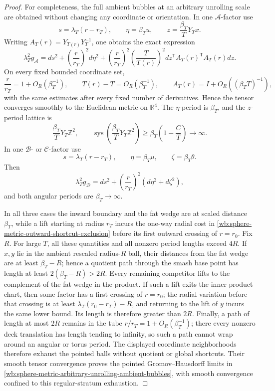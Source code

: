 \begin{proof}
For completeness, the full ambient bubbles at an arbitrary unrolling scale
are obtained without changing any coordinate or orientation.  In one
\(\mathcal A\)-factor use
\[
 s=\lambda_T(r-r_T),\qquad
 \eta=\beta_Tu,\qquad
 z=\frac{\beta_T}{T}Y_Tx.
\]
Writing \(A_T(r)=Y_{T(r)}Y_T^{-1}\), one obtains the exact expression
\[
 \lambda_T^2g_{\mathcal A}
 =ds^2+\left(\frac r{r_T}\right)^2d\eta^2
  +\left(\frac r{r_T}\right)^2
   \left(\frac{T}{T(r)}\right)^2
   dz^{\mathsf T}A_T(r)^{\mathsf T}A_T(r)dz.
\]
On every fixed bounded coordinate set,
\[
 \frac r{r_T}=1+O_R(\beta_T^{-1}),\qquad
 T(r)-T=O_R(\beta_T^{-1}),\qquad
 A_T(r)=I+O_R((\beta_TT)^{-1}),
\]
with the same estimates after every fixed number of derivatives.  Hence
the tensor converges smoothly to the Euclidean metric on \(\mathbb R^4\).
The \(\eta\)-period is \(\beta_T\), and the \(z\)-period lattice is
\[
 \frac{\beta_T}{T}Y_T\mathbb Z^2,
 \qquad
 \operatorname{sys}\left(
   \frac{\beta_T}{T}Y_T\mathbb Z^2\right)
 \geq\beta_T\left(1-\frac CT\right)\longrightarrow\infty.
\]
In one \(\mathcal B\)- or \(\mathcal C\)-factor use
\[
 s=\lambda_T(r-r_T),\qquad
 \eta=\beta_Tu,\qquad \zeta=\beta_T\theta.
\]
Then
\[
 \lambda_T^2g_{\mathcal D}
 =ds^2+\left(\frac r{r_T}\right)^2
       (d\eta^2+d\zeta^2),
\]
and both angular periods are \(\beta_T\to\infty\).

In all three cases the inward boundary and the fat wedge are at scaled
distance \(\beta_T\), while a lift starting at radius \(r_T\) incurs the
one-way radial cost in
\eqref{wb:sphere-metric-outward-shortcut-exclusion} before its first outward
crossing of \(r=r_0\).  Fix \(R\).  For large \(T\), all these quantities
and all nonzero period lengths exceed \(4R\).
If \(x,y\) lie in the ambient rescaled radius-\(R\) ball, their distances
from the fat wedge are at least \(\beta_T-R\); hence a quotient path through
the smash base point has length at least \(2(\beta_T-R)>2R\).  Every
remaining competitor lifts to the complement of the fat wedge in the
product.  If such a lift exits the inner product chart, then some factor
has a first crossing of \(r=r_0\); the radial variation before that crossing
is at least \(\lambda_T(r_0-r_T)-R\), and returning to the lift of \(y\)
incurs the same lower bound.  Its length is therefore greater than \(2R\).
Finally, a path of length at most \(2R\) remains in the tube
\(r/r_T=1+O_R(\beta_T^{-1})\); there every nonzero deck translation has
length tending to infinity, so such a path cannot wrap around an angular
or torus period.  The displayed coordinate neighborhoods therefore exhaust
the pointed balls without quotient or global shortcuts.
Their smooth tensor convergence proves the pointed Gromov--Hausdorff
limits in
\eqref{wb:sphere-metric-arbitrary-unrolling-ambient-bubbles}, with smooth
convergence confined to this regular-stratum exhaustion.
\end{proof}

